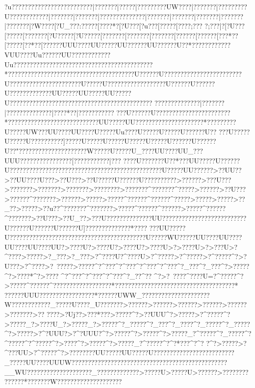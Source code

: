 {{{{{{{{{{{{{{{{{{{{{{{{{{{{{{{{{{{{{{{{{{{{{{{{{{{{{{{{{{{{{{{{{{{{{{{{{{{{{{{{{{{{{{{{{{{{{{{{{{{{{{{{{{{{{{{{{{{{{{{{{{{{{{{{{{?u???????}????? ?????????????|???????|?????|?????????UW????|???????|?????????U????????????|???????|???????|???????{???????|???????|???????|???????|???????|???????|?W???{?[?U_??{?:???? {?[????*{?[?U?? {?[?u?? {?[???? {?[??? {?;???
 {?;???  |?[?U???[???  ??[???  ????[?U?????[?U?????[???????[???????[???????[???? ??[???? ??[???* ??[???  ??[??*  ??[???  ???UUU????UU?????UU??????UU??????U??*??????? ?????VUU????Uu??????UU????????????Uu???????????????????????????????????????????*???????????? ?????? ?????? ?????? ?????? ???U??????U????????????????????????U???????? ????? ?????? ???U?? ???U?? ????}????????? ???U??????U??????U?????????????UU????{?UU????{?UU????{?U?????{???????{???????{???????{???????{???????{????
??{???? ??{???? ??|???????|???????{???????|????*??|???? ???????
???U??????U???????????????????????*?????? ?????? ?????? ????? ?????UU?????UU??????????????? ??????* ??????  ???U?? ???UW? ??UU????UU????U?????Uu????U?????U?????U??????U??
???U?? ???U?? ???U?? ????????]?????U?????U?????U?????U?????U??????U??????U??"????? ????? ???? ????? ??W?????U?????U_????UU????UU_???UUU???{???????{??????[??????{???  ??|???
 ????U???????U??*???UU?????U??????U??????????????????????????????????????? ?????  ???U?????UU????  ??>??UU??>??UU????U???>??U???>??U?????U??????U??????????>??????>???U???>???????>???????>???????>?????? ??>???????^???????^?????>?????? >??U???>?????? ^???????>?????? >????? >????? ^??????^??????^?????>????? >????? >??_?? >????? >??u?? ^???????^???????>????? ^??????^??????>????? ^??????^???????>??U???>??U_??>???U??????  ????  ????UU?????? ????????????????????U??????U??????U??????U]??????????????*????
 ???UU?????U??????????????????????????????????????????U?????WU?????UU????UU????UU????UU????UU?>????U?>????U?>????U?>????U>?>????U>?>???U>?^? ???>?? ???>?_?  ??>?_?  ??>?^????U?^????U>?^?????>?^?????>?^?????^?>?U???>?^? ???>?~?????>?? ???^?^?  ??^?^?  ??^?^?  ??^?^?  ??^?_?  ??^?_?  ??^?>?????^?>????*^?>????
^?^?  ??^?^?  ??^?^?  ??^?_?  ?^??   
^?>?~????^????U=?^?????^?>?????^??????^???????????? ??????*??????????  ???????????????????????????*
???   ???UUU???? ?????????????*??????UWW_?????????????????????W????????????_?????U????_U???????>??????>??????>??????>??????>??? ???>???????>?? 
????>?Uj??>???*???>?? ???^?>??UUU^?>?????>?^?????^?>?????_?>????U_?>?????_?>?????^?_?????^?_???^?_????^?_?????^?_?????^?>?????>?^?UUU?>?^?UUU?^?>?????^?>?????^?>?????_?^?????^?_?????^?^?????^?^?????^?>? ???^?>?????^?>?????_?^?????^?^?*???^?^? 
?^?>?????>?^???UU>?^?????^?>????????UU?????UU?????U?????????????????????????_?????UU????UUUW????????????????????????????????????????????????__WU????????????????????_?????????????>?????U>?????U>??????>???????? ??????  *???????W????????????????????
}}}}}}}}}}}}}}}}}}}}}}}}}}}}}}}}}}}}}}}}}}}}}}}}}}}}}}}}}}}}}}}}}}}}}}}}}}}}}}}}}}}}}}}}}}}}}}}}}}}}}}}}}}}}}}}}}}}}}}}}}}}}}}}}}}}}}}}}}}}}}}}}}}}}}}}}}
